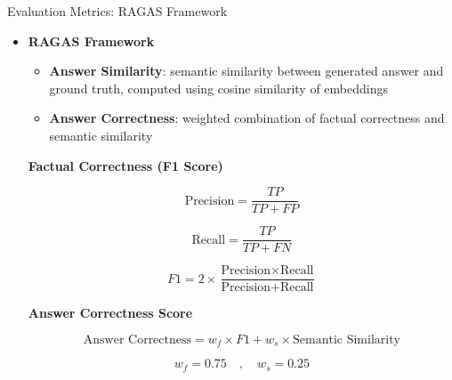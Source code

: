 \documentclass[aspectratio=169,xcolor=dvipsnames]{beamer}
\begin{document}
	\begin{frame}{Evaluation Metrics: RAGAS Framework}
		
		\scriptsize
		
		\begin{itemize}
			
			\item \textbf{\textcolor{blue!70}{RAGAS Framework}}
			\begin{itemize}
				\item \textbf{\textcolor{teal!80}{Answer Similarity}}:
				semantic similarity between generated answer and ground truth,
				computed using cosine similarity of embeddings
				
				\vspace{0.15cm}
				
				\item \textbf{\textcolor{teal!80}{Answer Correctness}}:
				weighted combination of factual correctness and semantic similarity
			\end{itemize}
			
			\vspace{0.25cm}
			
			\textbf{\textcolor{purple!80}{Factual Correctness (F1 Score)}}
			
			\vspace{0.1cm}
			
			\[
			\text{Precision} = \frac{TP}{TP + FP}
			\]
			
			\[
			\text{Recall} = \frac{TP}{TP + FN}
			\]
			
			\[
			F1 = 2 \times \frac{\text{Precision} \times \text{Recall}}
			{\text{Precision} + \text{Recall}}
			\]
			
			\textbf{\textcolor{purple!80}{Answer Correctness Score}}
			
			\vspace{0.1cm}
			
			\[
			\text{Answer Correctness}
			= w_f \times F1
			+ w_s \times \text{Semantic Similarity}
			\]
			
			\[
			w_f = 0.75 \quad,\quad w_s = 0.25
			\]
			
		\end{itemize}
		
	\end{frame}
	
\end{document}
